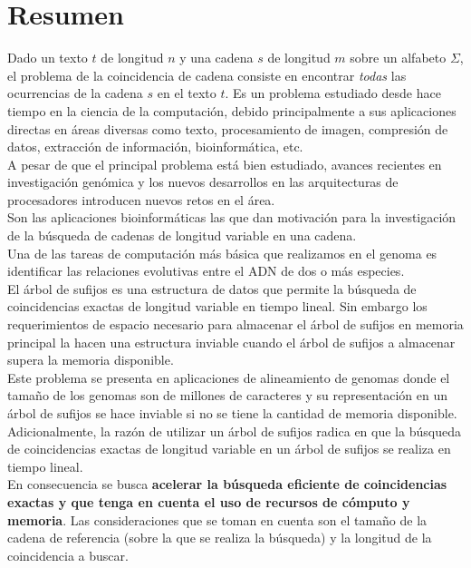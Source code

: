 \documentclass[11pt,a4paper,english]{article}
\begin{document}
\section{Resumen}
\indent
Dado un texto $t$ de longitud $n$ y una cadena $s$ de longitud $m$ sobre un alfabeto $\Sigma$, el problema de la coincidencia de cadena
consiste en encontrar \textit{todas} las ocurrencias de la cadena $s$ en el texto
$t$. Es un problema estudiado desde hace tiempo en la ciencia de la computaci\'on,
debido principalmente a sus aplicaciones directas en áreas diversas como texto,
procesamiento de imagen, compresión de datos, extracci\'on de informaci\'on,
bioinform\'atica, etc.\\ 
\indent
A pesar de que el principal problema est\'a bien estudiado, avances recientes en 
investigaci\'on gen\'omica y los nuevos desarrollos en las arquitecturas de 
procesadores introducen nuevos retos en el \'area.\\
\indent
Son las aplicaciones bioinform\'aticas las que dan motivaci\'on para la
investigaci\'on de la b\'usqueda de cadenas de longitud variable en una cadena.\\
\indent
Una de las tareas de computaci\'on m\'as b\'asica que realizamos en el genoma es
identificar las relaciones evolutivas entre el ADN de dos o m\'as especies.\\
\indent
El \'arbol de sufijos es una estructura de datos que permite la b\'usqueda de 
coincidencias exactas de longitud variable en tiempo lineal. Sin embargo los 
requerimientos de espacio necesario para almacenar el \'arbol de sufijos en 
memoria principal la hacen una estructura inviable cuando el \'arbol de sufijos a
almacenar supera la memoria disponible.\\
\indent
Este problema se presenta en aplicaciones de alineamiento de genomas donde el
tama\~no de los genomas son de millones de caracteres y su representaci\'on en un
\'arbol de sufijos se hace inviable si no se tiene la cantidad de memoria 
disponible. Adicionalmente, la raz\'on de utilizar un árbol de sufijos radica en
que la b\'usqueda de coincidencias exactas de longitud variable en un \'arbol de 
sufijos se realiza en tiempo lineal.\\
\indent
En consecuencia se busca \textbf{acelerar la b\'usqueda eficiente de 
coincidencias exactas y que tenga en cuenta el uso de recursos de c\'omputo y
memoria}. Las consideraciones que se toman en cuenta son el tama\~no de la cadena 
de referencia (sobre la que se realiza la b\'usqueda) y la longitud de la 
coincidencia a buscar.
\end{document}
